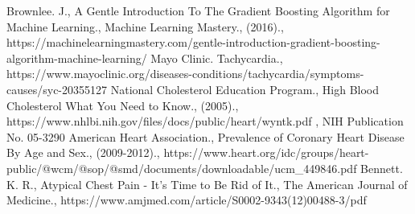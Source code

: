 \documentclass[conference]{IEEEtran}
\begin{document}
\begin{thebibliography}{00}
 Brownlee. J., A Gentle Introduction To The Gradient Boosting Algorithm for Machine Learning., Machine Learning Mastery., (2016)., https://machinelearningmastery.com/gentle-introduction-gradient-boosting-algorithm-machine-learning/
 Mayo Clinic. Tachycardia., https://www.mayoclinic.org/diseases-conditions/tachycardia/symptoms-causes/syc-20355127
 National Cholesterol Education Program., High Blood Cholesterol What You Need to Know., (2005)., https://www.nhlbi.nih.gov/files/docs/public/heart/wyntk.pdf , NIH Publication No. 05-3290
 American Heart Association., Prevalence of Coronary Heart Disease By Age and Sex., (2009-2012)., https://www.heart.org/idc/groups/heart-public/@wcm/@sop/@smd/documents/downloadable/ucm\_449846.pdf
 Bennett. K. R., Atypical Chest Pain - It's Time to Be Rid of It., The American Journal of Medicine., https://www.amjmed.com/article/S0002-9343(12)00488-3/pdf
\end{thebibliography}
\end{document}
